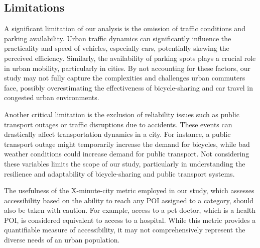 
\subsection{Limitations}
\label{sec:limitations}



A significant limitation of our analysis is the omission of traffic conditions and parking availability. 
Urban traffic dynamics can significantly influence the practicality and speed of vehicles, especially cars, potentially skewing the perceived efficiency.
Similarly, the availability of parking spots plays a crucial role in urban mobility, particularly in cities.
By not accounting for these factors, our study may not fully capture the complexities and challenges urban commuters face, possibly overestimating the effectiveness of bicycle-sharing and car travel in congested urban environments.

Another critical limitation is the exclusion of reliability issues such as public transport outages or traffic disruptions due to accidents. 
These events can drastically affect transportation dynamics in a city. 
For instance, a public transport outage might temporarily increase the demand for bicycles, while bad  weather conditions could increase demand for public transport.
Not considering these variables limits the scope of our study, particularly in understanding the resilience and adaptability of bicycle-sharing and public transport systems.

The usefulness of the X-minute-city metric employed in our study, which assesses accessibility based on the ability to reach any POI assigned to a category, should also be taken with caution.
For example, access to a pet doctor, which is a health POI, is considered equivalent to access to a hospital.
While this metric provides a quantifiable measure of accessibility, it may not comprehensively represent the diverse needs of an urban population. 

